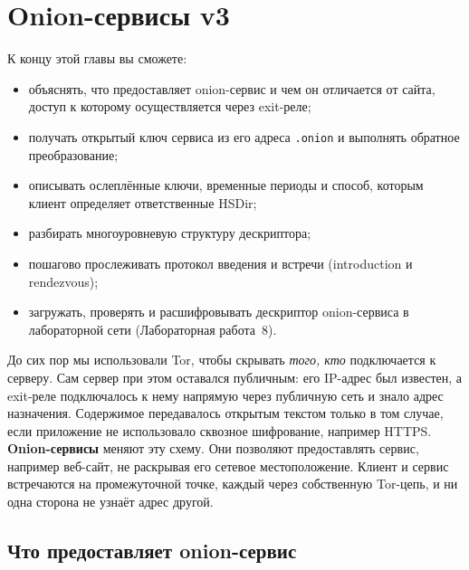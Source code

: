 \chapter{Onion-сервисы v3}\label{cap:14-onion-services}

\begin{obiettivi}
К концу этой главы вы сможете:
\begin{itemize}[nosep]
  \item объяснять, что предоставляет onion-сервис и чем он отличается от сайта, доступ к которому осуществляется через exit-реле;
  \item получать открытый ключ сервиса из его адреса \texttt{.onion} и выполнять обратное преобразование;
  \item описывать ослеплённые ключи, временные периоды и способ, которым клиент определяет ответственные HSDir;
  \item разбирать многоуровневую структуру дескриптора;
  \item пошагово прослеживать протокол введения и встречи (introduction и rendezvous);
  \item загружать, проверять и расшифровывать дескриптор onion-сервиса в лабораторной сети (Лабораторная работа~8).
\end{itemize}
\end{obiettivi}

До сих пор мы использовали Tor, чтобы скрывать \emph{того, кто} подключается к серверу. Сам сервер при этом оставался публичным: его IP-адрес был известен, а exit-реле подключалось к нему напрямую через публичную сеть и знало адрес назначения. Содержимое передавалось открытым текстом только в том случае, если приложение не использовало сквозное шифрование, например HTTPS. \textbf{Onion-сервисы} меняют эту схему. Они позволяют предоставлять сервис, например веб-сайт, не раскрывая его сетевое местоположение. Клиент и сервис встречаются на промежуточной точке, каждый через собственную Tor-цепь, и ни одна сторона не узнаёт адрес другой.

\section{Что предоставляет onion-сервис}\label{sec:os-proprieta}

